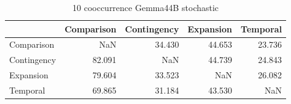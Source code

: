 \begin{table}
\caption{10 cooccurrence Gemma44B stochastic}
\begin{tabular}{lrrrr}
\toprule
 & Comparison & Contingency & Expansion & Temporal \\
\midrule
Comparison & NaN & 34.430 & 44.653 & 23.736 \\
Contingency & 82.091 & NaN & 44.739 & 24.843 \\
Expansion & 79.604 & 33.523 & NaN & 26.082 \\
Temporal & 69.865 & 31.184 & 43.530 & NaN \\
\bottomrule
\end{tabular}
\end{table}
